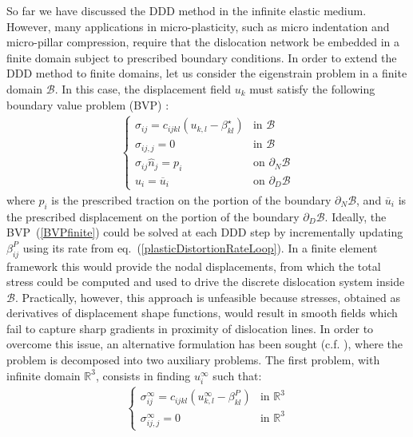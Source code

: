 So far we have discussed the DDD method in the infinite elastic medium. However, many applications in micro-plasticity, such as micro indentation and micro-pillar compression, require that the dislocation network be embedded in a finite domain subject to prescribed boundary conditions. In order to extend the DDD method to finite domains, let us consider the eigenstrain problem in a finite domain   $\mathcal{B}$. In this case, the displacement field $u_k$ must satisfy the following boundary value problem (BVP) :
\begin{align}
\begin{cases}
\sigma_{ij}=c_{ijkl}\left(u_{k,l}-\beta^\star_{kl}\right) & \mbox{in }\mathcal{B}\\
\sigma_{ij,j}=0 & \mbox{in }\mathcal{B}\\
\sigma_{ij}\hat{n}_j=p_i & \mbox{on } \partial_N\mathcal{B}\\
u_i=\overline{u}_i & \mbox{on } \partial_D\mathcal{B}
\end{cases}
\label{BVPfinite}
\end{align}
where $p_i$ is the prescribed traction on the portion of the boundary $\partial_N\mathcal{B}$, and $\overline{u}_i$ is the prescribed displacement on the portion of the boundary $\partial_D\mathcal{B}$. Ideally, the BVP~(\ref{BVPfinite}) could be solved at each DDD step by incrementally updating $\beta^P_{ij}$ using its rate from eq.~(\ref{plasticDistortionRateLoop}). In a finite element framework this would provide the nodal displacements, from which the total stress could be computed and used to drive the discrete dislocation system inside $\mathcal{B}$. Practically, however, this approach is unfeasible because stresses, obtained as derivatives of displacement shape functions, would result in smooth fields which fail to  capture  sharp gradients in proximity of dislocation lines. In order to overcome this issue, an alternative formulation has been sought (c.f. \cite{eshelby1979boundary,Lubarda:1993uc,vanderGiessen:1995tm,Deng:2008fs,Weygand:2002tq}),  where the problem is decomposed into two auxiliary problems. The first problem, with infinite domain $\mathbb{R}^3$, consists in finding $u_i^\infty$ such that:
\begin{align}
\begin{cases}
\sigma^{\infty}_{ij}=c_{ijkl}(u^{\infty}_{k,l}-\beta^{P}_{kl}) & \mbox{in }\mathbb{R}^3\\
\sigma^{\infty}_{ij,j}=0 & \mbox{in }\mathbb{R}^3
\end{cases}
\label{BVPinfinite}
\end{align}
